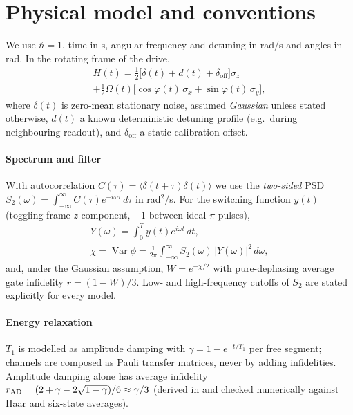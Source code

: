 \section{Physical model and conventions}
\label{sec:model}

We use $\hbar=1$, time in s, angular frequency and detuning in rad/s and angles in rad. In the
rotating frame of the drive,
\begin{multline}
  H(t) = \tfrac{1}{2}\bigl[\delta(t) + d(t) + \delta_{\mathrm{off}}\bigr]\sigma_z\\
       + \tfrac{1}{2}\Omega(t)\bigl[\cos\varphi(t)\,\sigma_x + \sin\varphi(t)\,\sigma_y\bigr],
\end{multline}
where $\delta(t)$ is zero-mean stationary noise, assumed \emph{Gaussian} unless stated
otherwise, $d(t)$ a known deterministic detuning profile (e.g.\ during neighbouring readout),
and $\delta_{\mathrm{off}}$ a static calibration offset.

\paragraph{Spectrum and filter} With autocorrelation
$C(\tau)=\langle\delta(t+\tau)\delta(t)\rangle$ we use the \emph{two-sided} PSD
$S_2(\omega)=\int_{-\infty}^{\infty} C(\tau)e^{-i\omega\tau}\,d\tau$ in rad$^2$/s.
For the switching function $y(t)$ (toggling-frame $z$ component, $\pm1$ between ideal $\pi$
pulses),
\begin{gather}
  Y(\omega)=\int_0^T y(t)e^{i\omega t}\,dt,\\
  \chi=\operatorname{Var}\phi=\frac{1}{2\pi}\int_{-\infty}^{\infty} S_2(\omega)\,|Y(\omega)|^2\,d\omega,
\end{gather}
and, under the Gaussian assumption, $W=e^{-\chi/2}$ with pure-dephasing average gate infidelity
$r=(1-W)/3$. Low- and high-frequency cutoffs of $S_2$ are stated explicitly for every model.

\paragraph{Energy relaxation} $T_1$ is modelled as amplitude damping with
$\gamma=1-e^{-t/T_1}$ per free segment; channels are composed as Pauli transfer matrices, never
by adding infidelities. Amplitude damping alone has average infidelity
$r_{\rm AD}=(2+\gamma-2\sqrt{1-\gamma})/6\approx\gamma/3$ (derived in  and
checked numerically against Haar and six-state averages).

